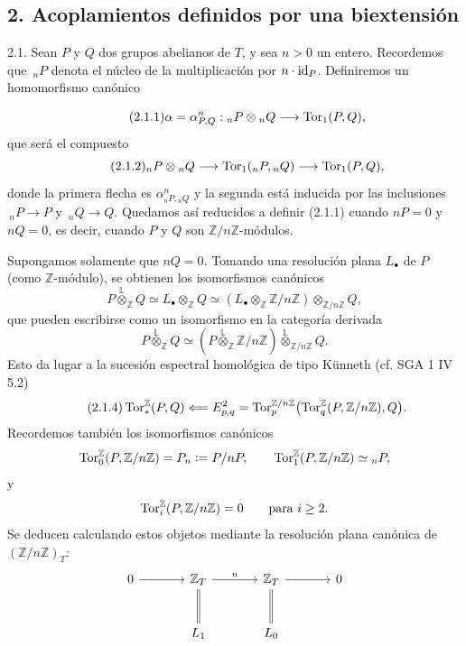 \subsection*{2. Acoplamientos definidos por una biextensión}

2.1. Sean $P$ y $Q$ dos grupos abelianos de $T$, y sea $n>0$ un
entero. Recordemos que $\,{}_nP$ denota el núcleo de la multiplicación
por $n\cdot\mathrm{id}_P$. Definiremos un homomorfismo canónico


\begin{equation}\tag{2.1.1}
 \alpha=\alpha^n_{P,Q}:
 {}_nP\otimes{}_nQ\longrightarrow\operatorname{Tor}_1(P,Q),
\end{equation}
que será el compuesto
\begin{equation}\tag{2.1.2}
 {}_nP\otimes{}_nQ
 \longrightarrow \operatorname{Tor}_1({}_nP,{}_nQ)
 \longrightarrow \operatorname{Tor}_1(P,Q),
\end{equation}
donde la primera flecha es $\alpha^n_{{}_nP,{}_nQ}$ y la segunda está
inducida por las inclusiones $\,{}_nP\longrightarrow P$ y
$\,{}_nQ\longrightarrow Q$. Quedamos así reducidos a definir (2.1.1)
cuando $nP=0$ y $nQ=0$, es decir, cuando $P$ y $Q$ son
$\mathbb Z/n\mathbb Z$-módulos.

Supongamos solamente que $nQ=0$. Tomando una resolución plana
$L_\bullet$ de $P$ (como $\mathbb Z$-módulo), se obtienen los
isomorfismos canónicos
\[
 P\mathbin{\overset{\mathbb L}{\otimes}_{\mathbb Z}}Q
 \simeq L_\bullet\otimes_{\mathbb Z}Q
 \simeq
 (L_\bullet\otimes_{\mathbb Z}\mathbb Z/n\mathbb Z)
 \otimes_{\mathbb Z/n\mathbb Z}Q,
\]
que pueden escribirse como un isomorfismo en la categoría derivada
\begin{equation}\tag{2.1.3}
 P\mathbin{\overset{\mathbb L}{\otimes}_{\mathbb Z}}Q
 \simeq
 \left(P\mathbin{\overset{\mathbb L}{\otimes}_{\mathbb Z}}
       \mathbb Z/n\mathbb Z\right)
 \mathbin{\overset{\mathbb L}{\otimes}_{\mathbb Z/n\mathbb Z}}Q.
\end{equation}
Esto da lugar a la sucesión espectral homológica de tipo Künneth
(cf. SGA 1 IV 5.2)
\begin{equation}\tag{2.1.4}
 \operatorname{Tor}^{\mathbb Z}_*(P,Q)
 \Longleftarrow
 E^2_{p,q}
 =
 \operatorname{Tor}^{\mathbb Z/n\mathbb Z}_p
 \bigl(\operatorname{Tor}^{\mathbb Z}_q(P,\mathbb Z/n\mathbb Z),Q\bigr).
\end{equation}
Recordemos también los isomorfismos canónicos
\[
 \operatorname{Tor}^{\mathbb Z}_0(P,\mathbb Z/n\mathbb Z)
 =P_n\mathrel{\mathop:}=P/nP,
 \qquad
 \operatorname{Tor}^{\mathbb Z}_1(P,\mathbb Z/n\mathbb Z)\simeq{}_nP,
\]
y
\[
 \operatorname{Tor}^{\mathbb Z}_i(P,\mathbb Z/n\mathbb Z)=0
 \qquad\text{para }i\geq2.
\]
Se deducen calculando estos objetos mediante la resolución plana
canónica de $(\mathbb Z/n\mathbb Z)_T$:
\[
\begin{tikzcd}[column sep=large,row sep=large]
 0\arrow[r]&
 \mathbb Z_T\arrow[r,"n"]\arrow[d,equal]&
 \mathbb Z_T\arrow[r]\arrow[d,equal]&
 0\\
 &L_1&L_0&
\end{tikzcd}
\]

